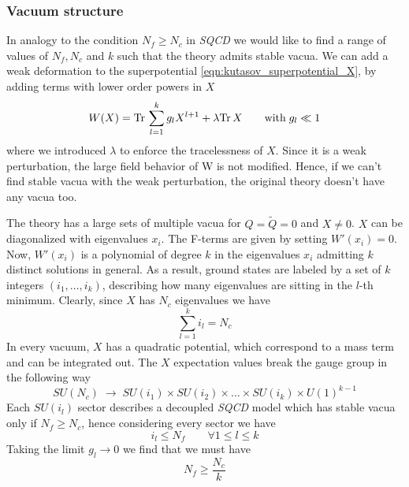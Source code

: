 \subsubsection{Vacuum structure}

In analogy to the condition $N_f \geq N_c$ in \emph{SQCD} we would like to find a range of values of $N_f,N_c$ and $k$ such that the theory admits stable vacua.  
We can add a weak deformation to the superpotential \eqref{eqn:kutasov_superpotential_X}, by adding terms with lower order powers in $X$
\begin{equation}
W(X) = \mathrm{Tr } \, \sum_{l=1}^k g_l X^{l+1} + \lambda \mathrm{Tr } \, X \qquad \hbox{with} \; g_l \ll 1
\end{equation}
where we introduced $\lambda$ to enforce the tracelessness of $X$.
Since it is a weak perturbation, the large field behavior of W is not modified.
Hence, if we can't find stable vacua with the weak perturbation, the original theory doesn't have any vacua too. 

The theory has a large sets of multiple vacua for $Q=\tilde{Q} = 0$ and $X \neq 0 $. 
$X$ can be diagonalized with eigenvalues $x_i$.
The F-terms are given by setting $W'(x_i) = 0$. 
Now, $W'(x_i)$ is a polynomial of degree $k$ in the eigenvalues $x_i$ admitting $k$ distinct solutions in general. 
As a result, ground states are labeled by a set of $k$ integers $(i_1, \dotsc, i_k)$, describing how many eigenvalues are sitting in the $l$-th minimum. Clearly, since $X$ has $N_c$ eigenvalues we have 
\begin{equation}
 \sum_{l=1}^k i_l = N_c
\end{equation}
In every vacuum, $X$ has a quadratic potential, which correspond to a mass term and can be integrated out.
The $X$ expectation values break the gauge group in the following way
\begin{equation}
	SU(N_c) \; \longrightarrow \; SU(i_1) \times SU(i_2) \times \dots \times SU(i_k) \times U(1)^{k-1}
\end{equation}
Each $SU({i_l})$ sector describes a decoupled \emph{SQCD} model which has stable vacua only if $N_f \geq N_c$, hence considering every sector we have 
\begin{equation}
i_l \leq N_f \qquad \forall 1 \leq l \leq k
\end{equation}
Taking the limit $g_l \rightarrow 0$ we find that we must have
\begin{equation}
 N_f \geq \frac{N_c}{k}
\end{equation}

